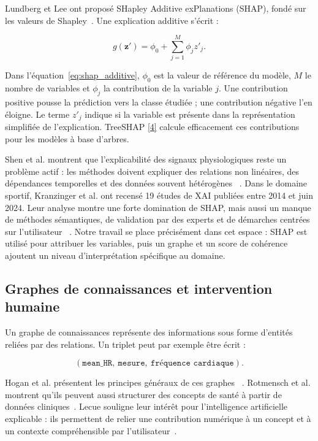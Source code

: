 \documentclass[12pt,a4paper]{article}
\newcommand{\openaccessref}[2]{%
  \nobreak\hspace{0.08em}%
  \href{#2}{\textcolor{green!35!black}{[#1]}}%
}
\begin{document}
Lundberg et Lee ont proposé SHapley Additive exPlanations (SHAP), fondé sur
les valeurs de Shapley~\cite{lundberg2017}. Une explication additive s'écrit :

\begin{equation}
g(\mathbf{z}')
=
\phi_0+\sum_{j=1}^{M}\phi_j z'_j.
\label{eq:shap_additive}
\end{equation}

Dans l'équation~\ref{eq:shap_additive}, $\phi_0$ est la valeur de référence du
modèle, $M$ le nombre de variables et $\phi_j$ la contribution de la variable
$j$. Une contribution positive pousse la prédiction vers la classe étudiée ;
une contribution négative l'en éloigne. Le terme $z'_j$ indique si la
variable est présente dans la représentation simplifiée de l'explication.
TreeSHAP\openaccessref{4}{https://arxiv.org/abs/1905.04610} calcule efficacement ces contributions pour les modèles à base
d'arbres.

Shen et al. montrent que l'explicabilité des signaux physiologiques reste un
problème actif : les méthodes doivent expliquer des relations non linéaires,
des dépendances temporelles et des données souvent hétérogènes
~\cite{shen2025}. Dans le domaine sportif, Kranzinger et al. ont recensé 19
études de XAI publiées entre 2014 et juin 2024. Leur analyse montre une forte
domination de SHAP, mais aussi un manque de méthodes sémantiques, de
validation par des experts et de démarches centrées sur l'utilisateur
~\cite{kranzinger2025}. Notre travail se place précisément dans cet espace :
SHAP est utilisé pour attribuer les variables, puis un graphe et un score de
cohérence ajoutent un niveau d'interprétation spécifique au domaine.

\subsection{Graphes de connaissances et intervention humaine}

Un graphe de connaissances représente des informations sous forme d'entités
reliées par des relations. Un triplet peut par exemple être écrit :

\[
(\texttt{mean\_HR},\ \texttt{mesure},\ \texttt{fréquence cardiaque}).
\]

Hogan et al. présentent les principes généraux de ces graphes
~\cite{hogan2020}. Rotmensch et al. montrent qu'ils peuvent aussi structurer
des concepts de santé à partir de données cliniques~\cite{rotmensch2017}.
Lecue souligne leur intérêt pour l'intelligence artificielle explicable :
ils permettent de relier une contribution numérique à un concept et à un
contexte compréhensible par l'utilisateur~\cite{lecue2020}.
\end{document}
